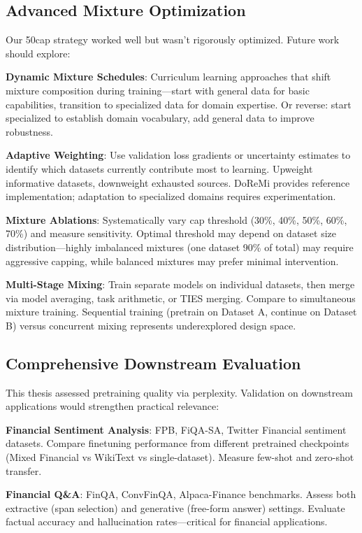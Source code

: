 \subsection{Advanced Mixture Optimization}

Our 50cap strategy worked well but wasn't rigorously optimized. Future work should explore:

\textbf{Dynamic Mixture Schedules}: Curriculum learning approaches that shift mixture composition during training—start with general data for basic capabilities, transition to specialized data for domain expertise. Or reverse: start specialized to establish domain vocabulary, add general data to improve robustness.

\textbf{Adaptive Weighting}: Use validation loss gradients or uncertainty estimates to identify which datasets currently contribute most to learning. Upweight informative datasets, downweight exhausted sources. DoReMi \parencite{xie2023doremi} provides reference implementation; adaptation to specialized domains requires experimentation.

\textbf{Mixture Ablations}: Systematically vary cap threshold (30\%, 40\%, 50\%, 60\%, 70\%) and measure sensitivity. Optimal threshold may depend on dataset size distribution—highly imbalanced mixtures (one dataset 90\% of total) may require aggressive capping, while balanced mixtures may prefer minimal intervention.

\textbf{Multi-Stage Mixing}: Train separate models on individual datasets, then merge via model averaging, task arithmetic, or TIES merging. Compare to simultaneous mixture training. Sequential training (pretrain on Dataset A, continue on Dataset B) versus concurrent mixing represents underexplored design space.

\subsection{Comprehensive Downstream Evaluation}

This thesis assessed pretraining quality via perplexity. Validation on downstream applications would strengthen practical relevance:

\textbf{Financial Sentiment Analysis}: FPB, FiQA-SA, Twitter Financial sentiment datasets. Compare finetuning performance from different pretrained checkpoints (Mixed Financial vs WikiText vs single-dataset). Measure few-shot and zero-shot transfer.

\textbf{Financial Q\&A}: FinQA, ConvFinQA, Alpaca-Finance benchmarks. Assess both extractive (span selection) and generative (free-form answer) settings. Evaluate factual accuracy and hallucination rates—critical for financial applications.

